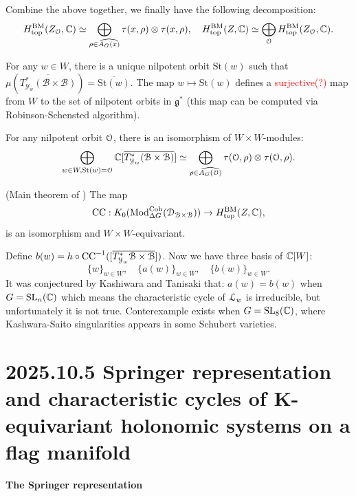\documentclass[12pt]{amsart}
\numberwithin{equation}{section}
\newcommand{\fg}{\mathfrak{g}} \newcommand{\fh}{\mathfrak{h}} \newcommand{\fk}{\mathfrak{k}}
\renewcommand{\bar}{\overline}
\begin{document}
Combine the above together, we finally have the following decomposition:
\[
  H^{\mathrm{BM}}_{\mathrm{top}}(Z_{{\mathcal {O}}},{\mathbb {C}}) \simeq \bigoplus_{\rho \in \widehat{A_G(x)}} \tau(x,\rho) \otimes \tau(x,\rho), \quad H_{\mathrm{top}}^{\mathrm{BM}}(Z,{\mathbb {C}}) \simeq \bigoplus_{{\mathcal {O}}} H^{\mathrm{BM}}_{\mathrm{top}}(Z_{{\mathcal {O}}},{\mathbb {C}}).
\]

For any $w \in W$, there is a unique nilpotent orbit $\mathrm{St}(w)$ such that $\mu(\bar{T^*_{\mathcal{Y}_w}(\mathcal{B} \times \mathcal{B})}) = \bar{\mathrm{St}(w)}$. The map $w \mapsto \mathrm{St}(w)$ defines a \textcolor{red}{surjective(?)} map from $W$ to the set of nilpotent orbits in $\fg^*$ (this map can be computed via Robinson-Schensted algorithm).

\begin{cor}
  For any nilpotent orbit ${\mathcal {O}}$, there is an isomorphism of $W \times W$-modules:
  \[
    \bigoplus\limits_{w \in W, \mathrm{St}(w) = \CO} \BC[\bar{T^*_{\mathcal{Y}_w}(\mathcal{B} \times \mathcal{B})}] \simeq \bigoplus\limits_{\rho \in \widehat{A_G(\CO)}} \tau(\CO,\rho) \otimes \tau(\CO,\rho).
  \]
\end{cor}

\begin{thm}(Main theorem of \cite{KT84}) The map
\[
\mathrm{CC} : K_0(\mathrm{Mod}^{\mathrm{Coh}}_{\Delta G}(\mathcal{D}_{\mathcal{B} \times \mathcal{B}})) \to H_{\mathrm{top}}^{\mathrm{BM}}(Z,{\mathbb {C}}),
\]
is an isomorphism and $W \times W$-equivariant.
\end{thm}




Define $b(w) = h \circ \mathrm{CC}^{-1}([\bar{T^*_{\CY_w}\CB \times \CB}])$.
Now we have three basis of ${\mathbb {C}}[W]$:
\[\{w\}_{w \in W}, \quad \{a(w)\}_{w \in W}, \quad \{b(w)\}_{w \in W}.\]  
It was conjectured by Kashiwara and Tanisaki that: $a(w) = b(w)$ when $G = {\mathrm{SL}}_n({\mathbb {C}})$ which means the characteristic cycle of ${\mathcal {L}}_w$ is irreducible, but unfortunately it is not true. Conterexample exists when $G = {\mathrm{SL}}_8({\mathbb {C}})$, where Kashwara-Saito singularities appears in some Schubert varieties.




\section{2025.10.5 Springer representation and characteristic cycles of K-equivariant holonomic systems on a flag manifold} 

\textbf{The Springer representation}
\end{document}
